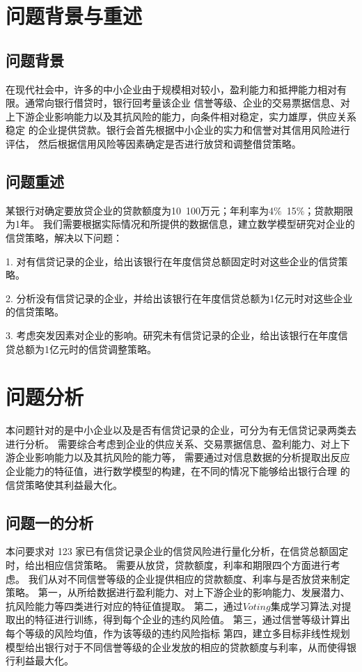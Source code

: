 \documentclass[UTF8]{ctexart}
\begin{document}
\newpage

\section{问题背景与重述}
\subsection{问题背景}
在现代社会中，许多的中小企业由于规模相对较小，盈利能力和抵押能力相对有限。通常向银行借贷时，银行回考量该企业
信誉等级、企业的交易票据信息、对上下游企业影响能力以及其抗风险的能力，向条件相对稳定，实力雄厚，供应关系稳定
的企业提供贷款。银行会首先根据中小企业的实力和信誉对其信用风险进行评估，
然后根据信用风险等因素确定是否进行放贷和调整借贷策略。

\subsection{问题重述}
某银行对确定要放贷企业的贷款额度为10~100万元；年利率为4$\%$~15$\%$；贷款期限为1年。
我们需要根据实际情况和所提供的数据信息，建立数学模型研究对企业的信贷策略，解决以下问题：

1. 对有信贷记录的企业，给出该银行在年度信贷总额固定时对这些企业的信贷策略。

2. 分析没有信贷记录的企业，并给出该银行在年度信贷总额为1亿元时对这些企业的信贷策略。

3. 考虑突发因素对企业的影响。研究未有信贷记录的企业，给出该银行在年度信贷总额为1亿元时的信贷调整策略。


\section{问题分析}
本问题针对的是中小企业以及是否有信贷记录的企业，可分为有无信贷记录两类去进行分析。
需要综合考虑到企业的供应关系、交易票据信息、盈利能力、对上下游企业影响能力以及其抗风险的能力等，
需要通过对信息数据的分析提取出反应企业能力的特征值，进行数学模型的构建，在不同的情况下能够给出银行合理
的信贷策略使其利益最大化。
\subsection{问题一的分析}
本问要求对 123 家已有信贷记录企业的信贷风险进行量化分析，在信贷总额固定时，给出相应信贷策略。
需要从放贷，贷款额度，利率和期限四个方面进行考虑。
我们从对不同信誉等级的企业提供相应的贷款额度、利率与是否放贷来制定策略。
第一，从所给数据进行盈利能力、对上下游企业的影响能力、发展潜力、抗风险能力等四类进行对应的特征值提取。
第二，通过$Voting$集成学习算法,对提取出的特征进行训练，得到每个企业的违约风险值。
第三，通过信誉等级计算出每个等级的风险均值，作为该等级的违约风险指标
第四，建立多目标非线性规划模型给出银行对于不同信誉等级的企业发放的相应的贷款额度与利率，从而使得银行利益最大化。
\end{document}
